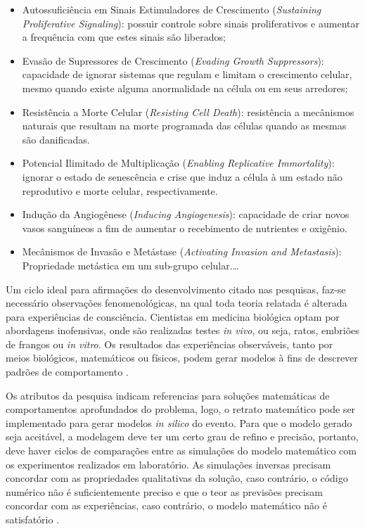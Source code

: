 \documentclass[12pt]{article}
\begin{document}
\begin{itemize}
  \item Autossuficiência em Sinais Estimuladores de Crescimento (\textit{Sustaining Proliferative Signaling}): possuir controle sobre sinais proliferativos e aumentar a frequência com que estes sinais são liberados;
  \item Evasão de Supressores de Crescimento (\textit{Evading Growth Suppressors}): capacidade de ignorar sistemas que regulam e limitam o crescimento celular, mesmo quando existe alguma anormalidade na célula ou em seus arredores;
  \item Resistência a Morte Celular (\textit{Resisting Cell Death}): resistência a mecânismos naturais que resultam na morte programada das células quando as mesmas são danificadas.
  \item Potencial Ilimitado de Multiplicação (\textit{Enabling Replicative Immortality}): ignorar o estado de senescência e crise que induz a célula à um estado não reprodutivo e morte celular, respectivamente.
  \item Indução da Angiogênese (\textit{Inducing Angiogenesis}): capacidade de criar novos vasos sanguíneos a fim de aumentar o recebimento de nutrientes e oxigênio.
  \item Mecânismos de Invasão e Metástase (\textit{Activating Invasion and Metastasis}): Propriedade metástica em um sub-grupo celular.\ldots
\end{itemize}


Um ciclo ideal para afirmações do desenvolvimento citado nas pesquisas, faz-se necessário observações fenomenológicas, na qual toda teoria relatada é alterada para experiências de consciência. Cientistas em medicina biológica optam por abordagens inofensivas, onde são realizadas testes \textit{in vivo}, ou seja, ratos, embriões de frangos ou \textit{in vitro}. Os resultados das experiências observáveis, tanto por meios biológicos, matemáticos ou físicos, podem gerar modelos à fins de descrever padrões de comportamento \cite{Preziosi2003}.

Os atributos da pesquisa indicam referencias para soluções matemáticas de comportamentos aprofundados do problema, logo, o retrato matemático pode ser implementado para gerar modelos \textit{in silico} do evento. Para que o modelo gerado seja aceitável, a modelagem deve ter um certo grau de refino e precisão, portanto, deve haver ciclos de comparações entre as simulações do modelo matemático com os experimentos realizados em laboratório. As simulações inversas precisam concordar com as propriedades qualitativas da solução, caso contrário, o código numérico não é suficientemente preciso e que o teor as previsões precisam concordar com as experiências, caso contrário, o modelo matemático não é satisfatório \cite{Preziosi2003}. %
\end{document}

